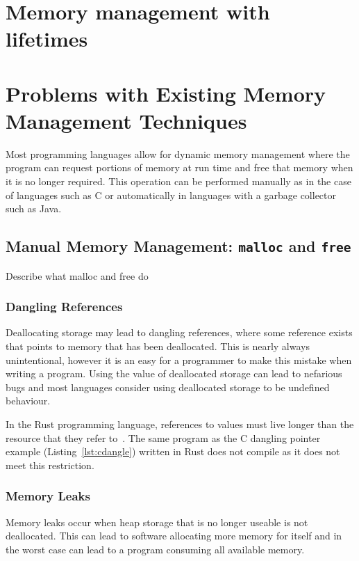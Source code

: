 \section{Memory management with lifetimes}

\section{Problems with Existing Memory Management Techniques}
Most programming languages allow for dynamic memory management where the
program can request portions of memory at run time and free that memory when it
is no longer required. This operation can be performed manually as in the case
of languages such as C or automatically in languages with a garbage collector
such as Java.

\subsection{Manual Memory Management: \texttt{malloc} and \texttt{free}}
Describe what malloc and free do

\subsubsection{Dangling References}
Deallocating storage may lead to dangling references, where some reference 
exists that points to memory that has been deallocated. This is nearly always
unintentional, however it is an easy for a programmer to make this mistake when
writing a program. Using the value of deallocated storage can lead to nefarious
bugs and most languages consider using deallocated storage to
be undefined behaviour.



In the Rust programming language, references to values must live longer than
the resource that they refer to~\cite{rust-borrowing}. The same program as the 
C dangling pointer example (Listing~\ref{lst:cdangle}) written in Rust does not
compile as it does not meet this restriction.



\subsubsection{Memory Leaks}
Memory leaks occur when heap storage that is no longer useable is not
deallocated. This can lead to software allocating more memory for itself and in
the worst case can lead to a program consuming all available memory.

